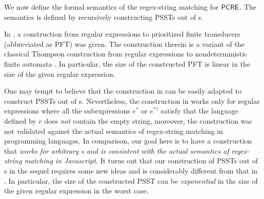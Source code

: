 


%
%

We now define the formal semantics of the regex-string matching for ${\sf PCRE}$. 
The semantics is defined by recursively constructing PSSTs out of {\pcre}s.

In \cite{BDM14,BM17}, a construction from regular expressions to prioritized finite transducers (abbreviated as PFT) was given. The construction therein is a variant of the classical Thompson construction from regular expressions to nondeterministic finite automata \cite{Thompson68}. In particular, the size of the constructed PFT is linear in the size of the given regular expression. 
%

One may tempt to believe that the construction in \cite{BDM14,BM17} can be easily adapted to construct PSSTs out of {\pcre}s. 
%
Nevertheless, the construction in \cite{BDM14,BM17} works only for regular expressions where all the subexpressions $e^*$ or $e^{*?}$ satisfy that the language defined by $e$ does \emph{not} contain the empty string, moreover, the construction was not validated against the actual semantics of regex-string matching in programming languages. 
%
In comparison, our goal here is to have a construction that \emph{works for arbitrary {\pcre}s and is consistent with the actual semantics of  regex-string matching in Javascript}. It turns out that our construction of PSSTs out of {\pcre}s in the sequel requires some new ideas and is considerably different from that in  \cite{BDM14,BM17}. In particular, the size of the constructed PSST can be \emph{exponential} in the size of the given regular expression in the worst case.

%
% 

